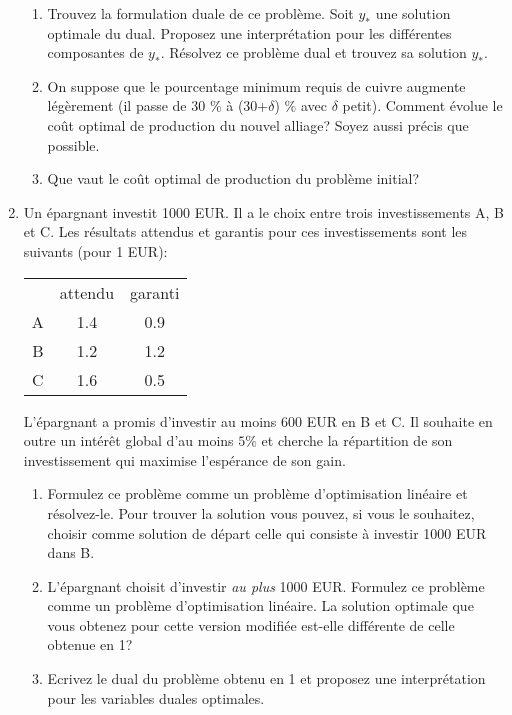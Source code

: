 \begin{enumerate}
\begin{enumerate}
      \item Trouvez la formulation duale de ce probl\`eme. Soit $y_*$ une solution
        optimale du dual. Proposez une interpr\'etation pour les
        diff\'erentes composantes de
        $y_*$. R\'esolvez ce probl\`eme dual et trouvez sa solution $y_*$.
      \item   On suppose que le pourcentage minimum requis de cuivre augmente l\'eg\`erement
        (il passe de 30 $\%$ \`a (30+$\delta$) $\%$ avec $\delta$ petit).
        Comment \'evolue le co\^ut optimal de production du nouvel alliage?
        Soyez aussi pr\'ecis que possible.

      \item Que vaut le co\^ut optimal de production du probl\`eme initial?
    \end{enumerate}




    \begin{solution}
      \nosolution
    \end{solution}

  \item  Un épargnant investit 1000 EUR. Il a le choix entre trois investissements A, B et C. Les résultats attendus et
    garantis pour ces investissements sont les suivants (pour 1 EUR):\\


    \begin{tabular}{ccc}
      & attendu & garanti\\
      A & 1.4 & 0.9\\
      B & 1.2 & 1.2\\
      C & 1.6 & 0.5\\
    \end{tabular}

    \hspace{10mm}

    L'épargnant a promis d'investir au moins 600 EUR en  B et C. Il souhaite en outre un intérêt global
    d'au moins
    $5 \%$ et cherche la répartition de son investissement  qui maximise l'espérance de son gain.

    \begin{enumerate}
      \item Formulez ce problème comme un problème d'optimisation linéaire et résolvez-le. Pour trouver la
        solution vous pouvez, si vous le souhaitez, choisir comme solution de départ celle qui consiste à investir 1000
        EUR dans B.
      \item L'épargnant choisit d'investir \emph{au plus}   1000 EUR. Formulez ce problème comme un problème
        d'optimisation linéaire. La solution optimale que vous obtenez pour cette version modifiée est-elle
        différente de celle obtenue en 1?
      \item Ecrivez le dual du problème obtenu en 1 et proposez une interprétation pour les variables duales
        optimales.
    \end{enumerate}



\end{enumerate}
